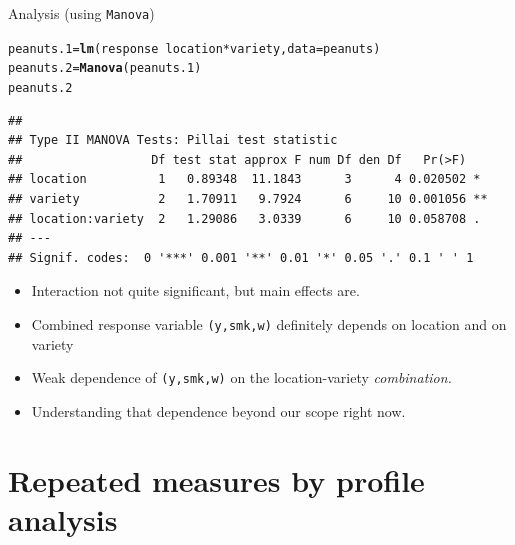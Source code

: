 \documentclass[unknownkeysallowed]{beamer}\usepackage[]{graphicx}\usepackage[]{color}
\makeatletter
\newcommand{\hlopt}[1]{\textcolor[rgb]{0,0,0}{#1}}%
\newcommand{\hlstd}[1]{\textcolor[rgb]{0.345,0.345,0.345}{#1}}%
\newcommand{\hlkwb}[1]{\textcolor[rgb]{0.69,0.353,0.396}{#1}}%
\newcommand{\hlkwc}[1]{\textcolor[rgb]{0.333,0.667,0.333}{#1}}%
\newcommand{\hlkwd}[1]{\textcolor[rgb]{0.737,0.353,0.396}{\textbf{#1}}}%
\newenvironment{kframe}{%
 \def\at@end@of@kframe{}%
 \ifinner\ifhmode%
  \def\at@end@of@kframe{\end{minipage}}%
  \begin{minipage}{\columnwidth}%
 \fi\fi%
 \def\FrameCommand##1{\hskip\@totalleftmargin \hskip-\fboxsep
 \colorbox{shadecolor}{##1}\hskip-\fboxsep
     \hskip-\linewidth \hskip-\@totalleftmargin \hskip\columnwidth}%
 \MakeFramed {\advance\hsize-\width
   \@totalleftmargin\z@ \linewidth\hsize
   \@setminipage}}%
 {\par\unskip\endMakeFramed%
 \at@end@of@kframe}
\newenvironment{knitrout}{}{} %
\makeatother
\begin{document}
\begin{frame}[fragile]{Analysis (using \texttt{Manova})}

\begin{knitrout}\scriptsize
{}\color{fgcolor}\begin{kframe}
\begin{alltt}
\hlstd{peanuts.1}\hlkwb{=}\hlkwd{lm}\hlstd{(response}\hlopt{~}\hlstd{location}\hlopt{*}\hlstd{variety,}\hlkwc{data}\hlstd{=peanuts)}
\hlstd{peanuts.2}\hlkwb{=}\hlkwd{Manova}\hlstd{(peanuts.1)}
\hlstd{peanuts.2}
\end{alltt}
\begin{verbatim}
## 
## Type II MANOVA Tests: Pillai test statistic
##                  Df test stat approx F num Df den Df   Pr(>F)   
## location          1   0.89348  11.1843      3      4 0.020502 * 
## variety           2   1.70911   9.7924      6     10 0.001056 **
## location:variety  2   1.29086   3.0339      6     10 0.058708 . 
## ---
## Signif. codes:  0 '***' 0.001 '**' 0.01 '*' 0.05 '.' 0.1 ' ' 1
\end{verbatim}
\end{kframe}
\end{knitrout}

\begin{itemize}
\item Interaction not quite significant, but main effects are.
\item Combined response variable \texttt{(y,smk,w)} definitely depends
  on location and on variety
\item Weak dependence of \texttt{(y,smk,w)} on the location-variety \emph{combination.}
\item Understanding that dependence beyond our scope right now.
\end{itemize}



  
\end{frame}


\section{Repeated measures by profile analysis}
\frame{\sectionpage}
\end{document}
